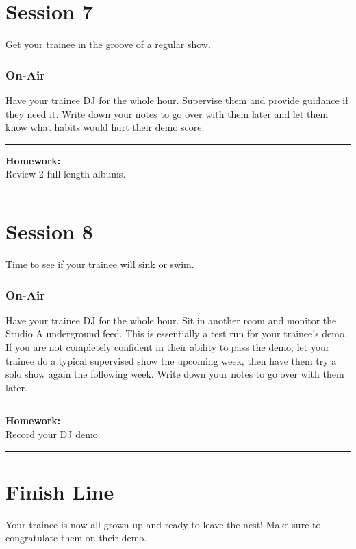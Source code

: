 \documentclass[]{witrman}
\newcommand{\makehomework}[1]{%
    \begin{samepage}
        \vspace{2pt}
        \rule{\textwidth}{1pt}
        \textbf{Homework:}\\
        #1\\
        \rule[3pt]{\textwidth}{1pt}
    \end{samepage}
}
\begin{document}
\chapter{Session 7}

Get your trainee in the groove of a regular show.

\subsection{On-Air}

Have your trainee DJ for the whole hour.  Supervise them and provide guidance if
they need it.  Write down your notes to go over with them later and let them
know what habits would hurt their demo score.

\makehomework{Review 2 full-length albums.}


\chapter{Session 8}

Time to see if your trainee will sink or swim.

\subsection{On-Air}

Have your trainee DJ for the whole hour.  Sit in another room and monitor the
Studio A underground feed.  This is essentially a test run for your trainee's
demo.  If you are not completely confident in their ability to pass the demo,
let your trainee do a typical supervised show the upcoming week, then have them
try a solo show again the following week.  Write down your notes to go over with
them later.

\makehomework{Record your DJ demo.}


\chapter{Finish Line}

Your trainee is now all grown up and ready to leave the nest!  Make sure to
congratulate them on their demo.

\makefooter{}
\end{document}
